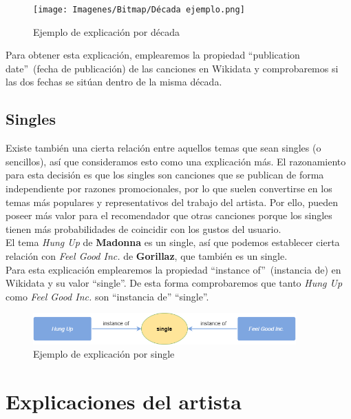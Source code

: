 \begin{figure}[h!]
	\centering
	\texttt{[image: Imagenes/Bitmap/Década ejemplo.png]}
	\caption{Ejemplo de explicación por década}
	\label{fig:sampleImage}
\end{figure}

Para obtener esta explicación, emplearemos la propiedad ``publication date''~(fecha de publicación) de las canciones en Wikidata y comprobaremos si las dos fechas se sitúan dentro de la misma década.\\

\subsection*{Singles}

Existe también una cierta relación entre aquellos temas que sean singles (o sencillos), así que consideramos esto como una explicación más. El razonamiento para esta decisión es que los singles son canciones que se publican de forma independiente por razones promocionales, por lo que suelen convertirse en los temas más populares y representativos del trabajo del artista. Por ello, pueden poseer más valor para el recomendador que otras canciones porque los singles tienen más probabilidades de coincidir con los gustos del usuario.\\

El tema \textit{Hung Up} de \textbf{Madonna} es un single, así que podemos establecer cierta relación con \textit{Feel Good Inc.} de \textbf{Gorillaz}, que también es un single.\\

Para esta explicación emplearemos la propiedad ``instance of''~(instancia de) en Wikidata y su valor ``single''. De esta forma comprobaremos que tanto \textit{Hung Up} como \textit{Feel Good Inc.} son ``instancia de'' ``single''.\\

\begin{figure}[h!]
	\centering
	\includegraphics[width = 0.9\textwidth]{Imagenes/Bitmap/Single ejemplo.png}
	\caption{Ejemplo de explicación por single}
	\label{fig:sampleImage}
\end{figure}

\section{Explicaciones del artista}

